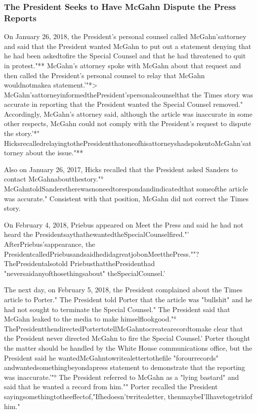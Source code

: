 \subsubsection{The President Seeks to Have McGahn Dispute the Press Reports}

On January 26, 2018, the President's personal counsel called McGahn'sattorney and said that the President wanted McGahn to put out a statement denying that he had been askedtofire the Special Counsel and that he had threatened to quit in protest."**
McGahn's attorney spoke with McGahn about that request and then called the President's personal counsel to relay that McGahn wouldnotmakea statement.'"*>
McGahn'sattorneyinformedthePresident'spersonalcounselthat the Times story was accurate in reporting that the President wanted the Special Counsel removed."
Accordingly, McGahn's attorney said, although the article was inaccurate in some other respects, McGahn could not comply with the President's request to dispute the story.'*" HicksrecalledrelayingtothePresidentthatoneofhisattorneyshadspokentoMcGahn'sattorney about the issue."**

Also on January 26, 2017, Hicks recalled that the President asked Sanders to contact McGahnaboutthestory."° McGahntoldSanderstherewasnoneedtorespondandindicatedthat someofthe article was accurate."
Consistent with that position, McGahn did not correct the Times story.

On February 4, 2018, Priebus appeared on Meet the Press and said he had not heard the PresidentsaythathewantedtheSpecialCounselfired."' AfterPriebus'sappearance, the PresidentcalledPriebusandsaidhedidagreatjobonMeetthePress.""?
ThePresidentalsotold PriebusthatthePresidenthad "neversaidanyofthosethingsabout" theSpecialCounsel.'

The next day, on February 5, 2018, the President complained about the Times article to Porter."
The President told Porter that the article was "bullshit" and he had not sought to terminate the Special Counsel."
The President said that McGahn leaked to the media to make himselflookgood."°
ThePresidentthendirectedPortertotellMcGahntocreatearecordtomake clear that the President never directed McGahn to fire the Special Counsel.'
Porter thought the matter should be handled by the White House communications office, but the President said he wantedMcGahntowritealettertothefile "forourrecords" andwantedsomethingbeyondapress statement to demonstrate that the reporting was inaccurate.'"°
The President referred to McGahn as a "lying bastard" and said that he wanted a record from him.""
Porter recalled the President sayingsomethingtotheeffectof,"Ifhedoesn'twritealetter, thenmaybeI'llhavetogetridof him."

